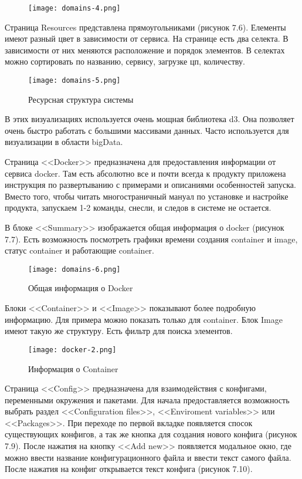 \begin{figure}[h!]
\centering
	\texttt{[image: domains-4.png]}
	\caption{}
	\clearpage
\end{figure}

Страница Resources представлена прямоугольниками (рисунок 7.6). Елементы имеют разный цвет в зависимости от сервиса. На странице есть два селекта. В зависимости от них меняются расположение и порядок элементов. В селектах можно сортировать по названию, сервису, загрузке цп, количеству. 

\begin{figure}[h!]
\centering
	\texttt{[image: domains-5.png]}
	\caption{Ресурсная структура системы}
	\clearpage
\end{figure}

В этих визуализациях используется очень мощная библиотека d3. Она позволяет очень быстро работать с большими массивами данных. Часто используется для визуализации в области bigData.

Страница <<Docker>> предназначена для предоставления информации от сервиса docker. Там есть абсолютно все и почти всегда к продукту приложена инструкция по развертыванию с примерами и описаниями особенностей запуска. Вместо того, чтобы читать многостраничный мануал по установке и настройке продукта, запускаем 1-2 команды, снесли, и следов в системе не остается. 

В блоке <<Summary>> изображается общая информация о docker (рисунок 7.7). Есть возможность посмотреть графики времени создания container и image, статус container и работающие container.

\begin{figure}[h!]
\centering
	\texttt{[image: domains-6.png]}
	\caption{Общая информация о Docker}
	\clearpage
\end{figure}

Блоки <<Container>> и <<Image>> показывают более подробную информацию. Для примера можно показать только для container. Блок Image имеют такую же структуру. Есть фильтр для поиска элементов.

\begin{figure}[h!]
\centering
	\texttt{[image: docker-2.png]}
	\caption{Информация о Container}
	\clearpage
\end{figure}

Страница <<Config>> предназначена для взаимодействия с конфигами, переменными окружения и пакетами. Для начала предоставляется возможность выбрать раздел <<Configuration files>>, <<Enviroment variables>> или <<Packages>>. При переходе по первой вкладке появляется спосок существующих конфигов, а так же кнопка для создания нового конфига (рисунок 7.9). После нажатия на кнопку <<Add new>> появляется модальное окно, где можно ввести название конфигурационного файла и ввести текст самого файла. После нажатия на конфиг открывается текст конфига (рисунок 7.10). 

